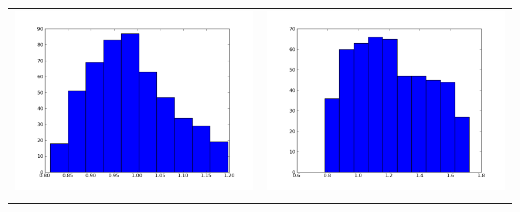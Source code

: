 \documentclass[12pt,a4paper,titlepage]{article}
\begin{document}
\begin{table}[ht]
\begin{tabular}{cc}
\includegraphics[scale=0.2]{p3th1_4}&\includegraphics[scale=0.2]{p3th2_4.png}\\
\newline

\end{tabular}
\end{table}
\end{document}

